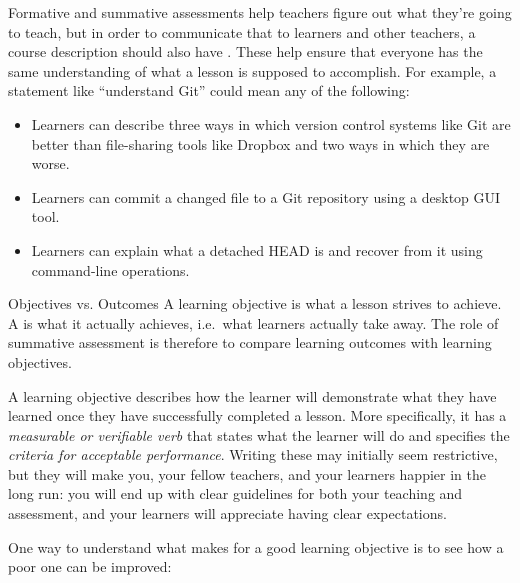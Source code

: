 
Formative and summative assessments help teachers figure out what they're going to teach,
but in order to communicate that to learners and other teachers,
a course description should also have
.
These help ensure that
everyone has the same understanding of what a lesson is supposed to accomplish.
For example,
a statement like ``understand Git'' could mean any of the following:

\begin{itemize}

\item
  Learners can describe three ways
  in which version control systems like Git are better than file-sharing tools like Dropbox
  and two ways in which they are worse.

\item
  Learners can commit a changed file to a Git repository
  using a desktop GUI tool.

\item
  Learners can explain what a detached HEAD is
  and recover from it using command-line operations.

\end{itemize}

\begin{aside}{Objectives vs. Outcomes}
  A learning objective is what a lesson strives to achieve.
  A  is what it actually achieves,
  i.e.\ what learners actually take away.
  The role of summative assessment is therefore
  to compare learning outcomes with learning objectives.
\end{aside}

A learning objective describes how the learner will demonstrate what they have learned
once they have successfully completed a lesson.
More specifically,
it has a \emph{measurable or verifiable verb} that states what the learner will do
and specifies the \emph{criteria for acceptable performance}.
Writing these may initially seem restrictive,
but they will make you,
your fellow teachers,
and your learners happier in the long run:
you will end up with clear guidelines for both your teaching and assessment,
and your learners will appreciate having clear expectations.

One way to understand what makes for a good learning objective
is to see how a poor one can be improved:

